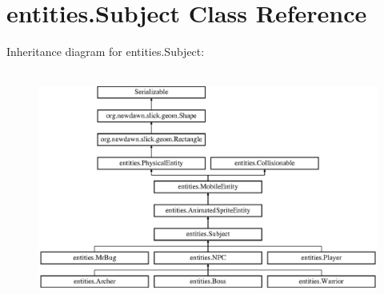 \hypertarget{classentities_1_1_subject}{}\section{entities.\+Subject Class Reference}
\label{classentities_1_1_subject}
Inheritance diagram for entities.\+Subject\+:\begin{figure}[H]
\begin{center}
\leavevmode
\includegraphics[height=7.671233cm]{classentities_1_1_subject}
\end{center}
\end{figure}
